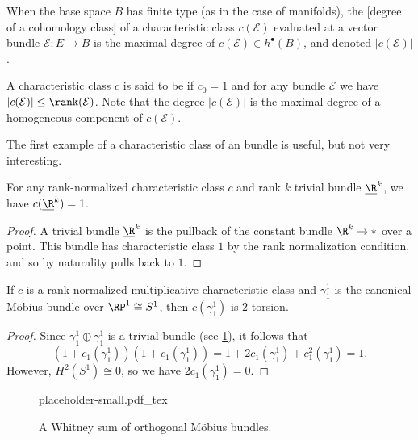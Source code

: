 \begin{remark}
	When the base space $B$ has finite type (as in the case of manifolds), the [degree of a cohomology class] of a characteristic class $c(\mathcal{E})$ evaluated at a vector bundle $\mathcal{E} : E \to B$ is the maximal degree of $c(\mathcal{E})\in h^\bullet(B)$, and denoted $|c(\mathcal{E})|$.
\end{remark}

\begin{definition}
	A characteristic class $c$ is said to be  if $c_0=1$ and for any bundle $\mathcal{E}$ we have $|c(\mathcal{E})|\leq \rank(\mathcal{E})$. Note that the degree $|c(\mathcal{E})|$ is the maximal degree of a homogeneous component of $c(\mathcal{E})$.
\end{definition}

The first example of a characteristic class of an bundle is useful, but not very interesting.

\begin{corollary}
	For any rank-normalized characteristic class $c$ and rank $k$ trivial bundle $\underline{\R}^k$, we have $c(\underline{\R}^k)=1$.
\end{corollary}
\begin{proof}
	A trivial bundle $\underline{\R}^k$ is the pullback of the constant bundle $\R^k\to *$ over a point. This bundle has characteristic class $1$ by the rank normalization condition, and so by naturality pulls back to $1$.
\end{proof}

\begin{corollary}\label{cor:mobius-characteristic-2-torsion}
	If $c$ is a rank-normalized multiplicative characteristic class and $\gamma_1^1$ is the canonical M\"obius bundle over $\RP^1\cong S^1$, then $c(\gamma_1^1)$ is $2$-torsion.
\end{corollary}
\begin{proof}
	Since $\gamma_1^1\oplus \gamma^1_1$ is a trivial bundle (see \cref{fig:trivial-mobius-bundle-sum}), it follows that
	\[
		(1+c_1(\gamma_1^1))(1+c_1(\gamma_1^1)) = 1+2c_1(\gamma_1^1)+c_1^2(\gamma_1^1)=1.
	\]
	However, $H^2(S^1)\cong 0$, so we have $2c_1(\gamma_1^1)=0$.
\end{proof}

\begin{figure}[ht]
	\centering
	{placeholder-small.pdf_tex}
	\caption{A Whitney sum of orthogonal M\"obius bundles.}\label{fig:trivial-mobius-bundle-sum}
\end{figure}


